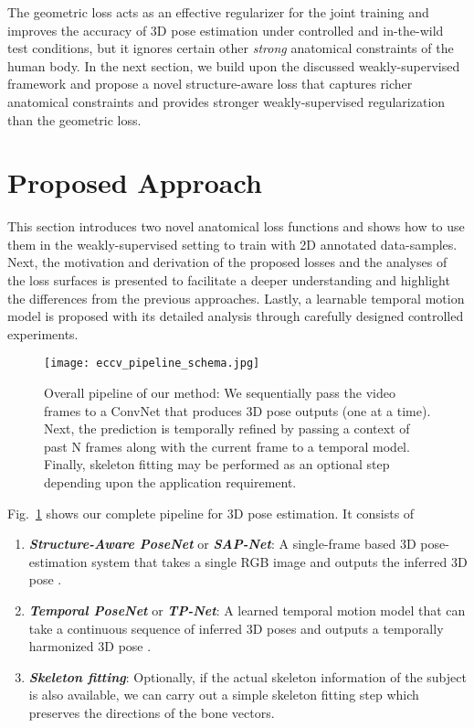\documentclass[runningheads]{llncs}
\begin{document}
The geometric loss acts as an effective regularizer for the joint training and improves the accuracy of 3D pose estimation under controlled and in-the-wild test conditions, but it ignores certain other \emph{strong} anatomical constraints of the human body. In the next section, we build upon the discussed weakly-supervised framework and propose a novel structure-aware loss that captures richer anatomical constraints and provides stronger weakly-supervised regularization than the geometric loss. 

\section{Proposed Approach}
This section introduces two novel anatomical loss functions and shows how to use them in the weakly-supervised setting to train with 2D annotated data-samples. Next, the motivation and derivation of the proposed losses and the analyses of the loss surfaces is presented to facilitate a deeper understanding and highlight the differences from the previous approaches. Lastly, a learnable temporal motion model is proposed with its detailed analysis through carefully designed controlled experiments.

\begin{figure}[!h] 
	\centering
	\texttt{[image: eccv\_pipeline\_schema.jpg]}
    \caption{Overall pipeline of our method: We sequentially pass the video frames to a ConvNet that produces 3D pose outputs (one at a time). Next, the prediction is temporally refined by passing a context of past N frames along with the current frame to a temporal model. Finally, skeleton fitting may be performed as an optional step depending upon the application requirement.} 
	\vspace{-1em}
	\label{fig:pipeSchema}
\end{figure}


Fig.~\ref{fig:pipeSchema} shows our complete pipeline for 3D pose estimation. It consists of 
\begin{enumerate}
    \item \emph{\bf Structure-Aware PoseNet} or \emph{\bf SAP-Net}: A single-frame based 3D pose-estimation system that takes a single RGB image  and outputs the inferred 3D pose .
    
    \item \emph{\bf Temporal PoseNet} or \emph{\bf TP-Net}: A learned temporal motion model that can take a continuous sequence of inferred 3D poses  and outputs a temporally harmonized 3D pose .
    
    \item \emph{\bf Skeleton fitting}: Optionally, if the actual skeleton information of the subject is also available, we can carry out a simple skeleton fitting step which preserves the directions of the bone vectors.
\end{enumerate}
\end{document}
